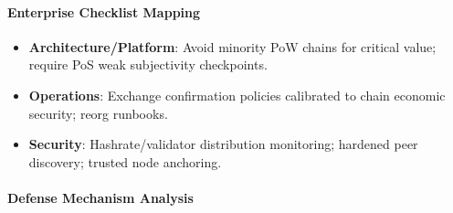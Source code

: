 \paragraph{Enterprise Checklist Mapping}
\begin{itemize}
    \item \textbf{Architecture/Platform}: Avoid minority PoW chains for critical value; require PoS weak subjectivity checkpoints.
    \item \textbf{Operations}: Exchange confirmation policies calibrated to chain economic security; reorg runbooks.
    \item \textbf{Security}: Hashrate/validator distribution monitoring; hardened peer discovery; trusted node anchoring.
\end{itemize}

\paragraph{Defense Mechanism Analysis}

